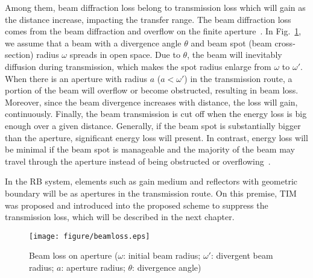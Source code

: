 \documentclass{IEEEtran}
\begin{document}
Among them, beam diffraction loss belong to transmission loss which will gain as the distance increase, impacting the transfer range.
The beam diffraction loss comes from the beam diffraction and overflow on the finite aperture~\cite{21}. 
In Fig.~\ref{dloss}, we assume that a beam with a divergence angle $\theta$ and beam spot (beam cross-section) radius $\omega$ spreads in open space. Due to $\theta$, the beam will inevitably diffusion during transmission, which makes the spot radius enlarge from $\omega$ to $\omega'$. 
When there is an aperture with radius $a$ ($a<\omega'$) in the transmission route, a portion of the beam will overflow or become obstructed, resulting in beam loss. Moreover, since the beam divergence increases with distance, the loss will gain, continuously. Finally, the beam transmission is cut off when the energy loss is big enough over a given distance. 
Generally, if the beam spot is substantially bigger than the aperture, significant energy loss will present. In contrast, energy loss will be minimal if the beam spot is manageable and the majority of the beam may travel through the aperture instead of being obstructed or overflowing~\cite{koechner2013solid,Hodgson2005Laser}. 

In the RB system, elements such as gain medium and reflectors with geometric boundary will be as apertures in the transmission route. 
On this premise, TIM was proposed and introduced into the proposed scheme to suppress the transmission loss, which will be described in the next chapter.





\begin{figure}[t]
	\centering
	\texttt{[image: figure/beamloss.eps]}
	\caption{Beam loss on aperture ($\omega$: initial beam radius; $\omega'$: divergent beam radius; $a$: aperture radius; $\theta$: divergence angle)}
	\label{dloss}
\end{figure}
\end{document}
